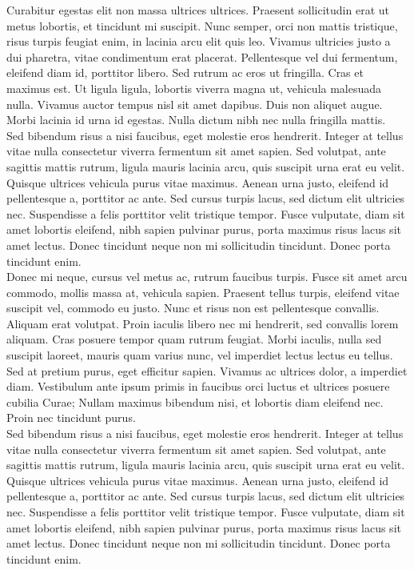 Curabitur egestas elit non massa ultrices ultrices. Praesent sollicitudin erat ut metus lobortis, et tincidunt mi suscipit. Nunc semper, orci non mattis tristique, risus turpis feugiat enim, in lacinia arcu elit quis leo. Vivamus ultricies justo a dui pharetra, vitae condimentum erat placerat. Pellentesque vel dui fermentum, eleifend diam id, porttitor libero. Sed rutrum ac eros ut fringilla. Cras et maximus est. Ut ligula ligula, lobortis viverra magna ut, vehicula malesuada nulla. Vivamus auctor tempus nisl sit amet dapibus. Duis non aliquet augue. Morbi lacinia id urna id egestas. Nulla dictum nibh nec nulla fringilla mattis.
\\

Sed bibendum risus a nisi faucibus, eget molestie eros hendrerit. Integer at tellus vitae nulla consectetur viverra fermentum sit amet sapien. Sed volutpat, ante sagittis mattis rutrum, ligula mauris lacinia arcu, quis suscipit urna erat eu velit. Quisque ultrices vehicula purus vitae maximus. Aenean urna justo, eleifend id pellentesque a, porttitor ac ante. Sed cursus turpis lacus, sed dictum elit ultricies nec. Suspendisse a felis porttitor velit tristique tempor. Fusce vulputate, diam sit amet lobortis eleifend, nibh sapien pulvinar purus, porta maximus risus lacus sit amet lectus. Donec tincidunt neque non mi sollicitudin tincidunt. Donec porta tincidunt enim.
\\

Donec mi neque, cursus vel metus ac, rutrum faucibus turpis. Fusce sit amet arcu commodo, mollis massa at, vehicula sapien. Praesent tellus turpis, eleifend vitae suscipit vel, commodo eu justo. Nunc et risus non est pellentesque convallis. Aliquam erat volutpat. Proin iaculis libero nec mi hendrerit, sed convallis lorem aliquam. Cras posuere tempor quam rutrum feugiat. Morbi iaculis, nulla sed suscipit laoreet, mauris quam varius nunc, vel imperdiet lectus lectus eu tellus. Sed at pretium purus, eget efficitur sapien. Vivamus ac ultrices dolor, a imperdiet diam. Vestibulum ante ipsum primis in faucibus orci luctus et ultrices posuere cubilia Curae; Nullam maximus bibendum nisi, et lobortis diam eleifend nec. Proin nec tincidunt purus. 
\\


Sed bibendum risus a nisi faucibus, eget molestie eros hendrerit. Integer at tellus vitae nulla consectetur viverra fermentum sit amet sapien. Sed volutpat, ante sagittis mattis rutrum, ligula mauris lacinia arcu, quis suscipit urna erat eu velit. Quisque ultrices vehicula purus vitae maximus. Aenean urna justo, eleifend id pellentesque a, porttitor ac ante. Sed cursus turpis lacus, sed dictum elit ultricies nec. Suspendisse a felis porttitor velit tristique tempor. Fusce vulputate, diam sit amet lobortis eleifend, nibh sapien pulvinar purus, porta maximus risus lacus sit amet lectus. Donec tincidunt neque non mi sollicitudin tincidunt. Donec porta tincidunt enim.
\\

